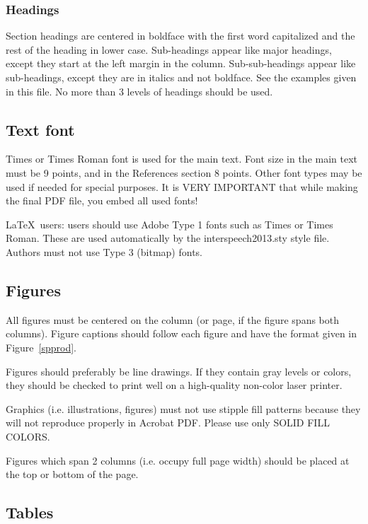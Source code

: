 \documentclass[a4paper]{article}
\begin{document}
\subsubsection{Headings}

Section headings are centered in boldface
with the first word capitalized and the rest of the heading in 
lower case. Sub-headings appear like major headings, except they 
start at the left margin in the column.
Sub-sub-headings appear like sub-headings, except they are in italics 
and not boldface. See the examples given in this 
file. No more than 3 levels of headings should be used.

\subsection{Text font}

Times or Times Roman font is used for the main text. Font size in the main text 
must be 9 points, and in the References section 8 points. Other font
types may be used if needed for special purposes. It is VERY IMPORTANT
that while making the final PDF file, you embed all used fonts!

\LaTeX\ users: users should use Adobe Type 1 fonts such as Times or Times
Roman. These are used automatically by the interspeech2013.sty style
file. Authors must not use Type 3 (bitmap) fonts.

\subsection{Figures}

All figures must be centered on the column (or page, if the figure spans 
both columns).
Figure captions should follow each figure and have the format given in 
Figure~\ref{spprod}.

Figures should preferably be line drawings. If they contain gray 
levels or colors, they should be checked to print well on a 
high-quality non-color laser printer.

Graphics (i.e. illustrations, figures) must not use stipple fill
patterns because they will not reproduce properly in Acrobat PDF.
Please use only SOLID FILL COLORS.

Figures which span 2 columns (i.e. occupy full page width) should be
placed at the top or bottom of the page.



\subsection{Tables}
\end{document}
